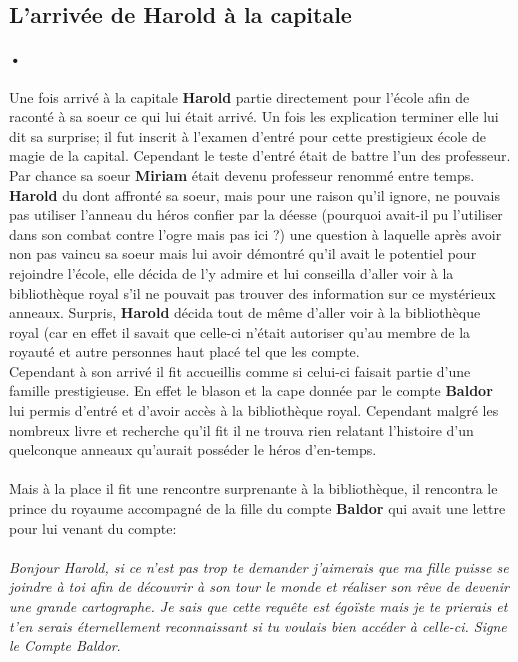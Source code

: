 \subsection{L'arrivée de Harold à la capitale}
\paragraph{•}Une fois arrivé à la capitale \textbf{Harold} partie directement pour l'école afin de raconté à sa soeur ce qui lui était arrivé. Un fois les explication terminer elle lui dit sa surprise; il fut inscrit à l'examen d'entré pour cette prestigieux école de magie de la capital. Cependant le teste d'entré était de battre l'un des professeur. Par chance sa soeur \textbf{Miriam} était devenu professeur renommé entre temps.\\
\textbf{Harold} du dont affronté sa soeur, mais pour une raison qu'il ignore, ne pouvais pas utiliser l'anneau du héros confier par la déesse (pourquoi avait-il pu l'utiliser dans son combat contre l'ogre mais pas ici ?) une question à laquelle après avoir non pas vaincu sa soeur mais lui avoir démontré qu'il avait le potentiel pour rejoindre l'école, elle décida de l'y admire et lui conseilla d'aller voir à la bibliothèque royal s'il ne pouvait pas trouver des information sur ce mystérieux anneaux. Surpris, \textbf{Harold} décida tout de même d'aller voir à la bibliothèque royal (car en effet il savait que celle-ci n'était autoriser qu'au membre de la royauté et autre personnes haut placé tel que les compte.\\
Cependant à son arrivé il fit accueillis comme si celui-ci faisait partie d'une famille prestigieuse. En effet le blason et la cape donnée par le compte \textbf{Baldor} lui permis d'entré et d'avoir accès à la bibliothèque royal. Cependant malgré les nombreux livre et recherche qu'il fit il ne trouva rien relatant l'histoire d'un quelconque anneaux qu'aurait posséder le héros d'en-temps.\\\\

Mais à la place il fit une rencontre surprenante à la bibliothèque, il rencontra le prince du royaume accompagné de la fille du compte \textbf{Baldor} qui avait une lettre pour lui venant du compte:\\\\

\textit{Bonjour Harold, si ce n'est pas trop te demander j'aimerais que ma fille puisse se joindre à toi afin de découvrir à son tour le monde et réaliser son rêve de devenir une grande cartographe. Je sais que cette requête est égoïste mais je te prierais et t'en serais éternellement reconnaissant si tu voulais bien accéder à celle-ci. Signe le Compte Baldor}.\\\\

